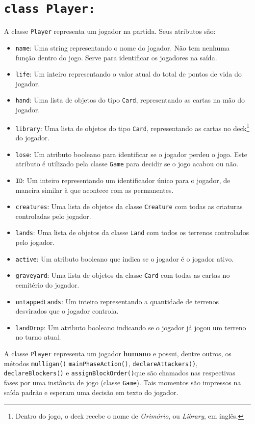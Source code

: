 \section{\texttt{class Player:}}
A classe \texttt{Player} representa um jogador na partida. Seus atributos são:
\begin{itemize}
  \item\texttt{name}: Uma string representando o nome do jogador. Não tem nenhuma função
  dentro do jogo. Serve para identificar os jogadores na saída.
  \item\texttt{life}: Um inteiro representando o valor atual do total de pontos de vida
  do jogador.
  \item\texttt{hand}: Uma lista de objetos do tipo \texttt{Card}, representando as cartas
  na mão do jogador.
  \item\texttt{library}: Uma lista de objetos do tipo \texttt{Card}, representando as cartas
  no deck\footnote{Dentro do jogo, o deck recebe o nome de \textit{Grimório}, ou \textit{Library},
  em inglês.} do jogador.
  \item\texttt{lose}: Um atributo booleano para identificar se o jogador perdeu o jogo. Este
  atributo é utilizado pela classe \texttt{Game} para decidir se o jogo acabou ou não.
  \item\texttt{ID}: Um inteiro representando um identificador único para o jogador, de maneira
  similar à que acontece com as permanentes.
  \item\texttt{creatures}: Uma lista de objetos da classe \texttt{Creature} com todas as
  criaturas controladas pelo jogador.
  \item\texttt{lands}: Uma lista de objetos da classe \texttt{Land} com todos os terrenos
  controlados pelo jogador.
  \item\texttt{active}: Um atributo booleano que indica se o jogador é o jogador ativo.
  \item\texttt{graveyard}: Uma lista de objetos da classe \texttt{Card} com todas as cartas
  no cemitério do jogador.
  \item\texttt{untappedLands}: Um inteiro representando a quantidade de terrenos desvirados que
  o jogador controla.
  \item\texttt{landDrop}: Um atributo booleano indicando se o jogador já jogou um terreno no
  turno atual.
\end{itemize}

A classe \texttt{Player} representa um jogador \textbf{humano} e possui, dentre outros, os métodos \texttt{mulligan()} \texttt{mainPhaseAction()}, \texttt{declareAttackers()}, \texttt{declareBlockers()}  e \texttt{assignBlockOrder()}que são chamados nas respectivas fases por uma instância de jogo (classe \texttt{Game}). Tais momentos são impressos na saída padrão e esperam uma decisão em texto do jogador.

